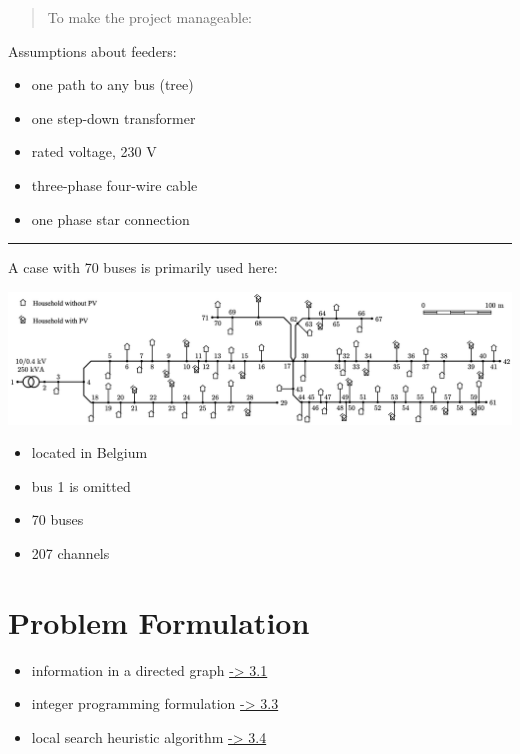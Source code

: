 \documentclass[
]{book}
\providecommand{\tightlist}{%
  \setlength{\itemsep}{0pt}\setlength{\parskip}{0pt}}
\begin{document}
\begin{quote}
To make the project manageable:
\end{quote}

Assumptions about feeders:

\begin{itemize}
\tightlist
\item
  one path to any bus (tree)
\item
  one step-down transformer
\item
  rated voltage, 230 V
\item
  three-phase four-wire cable
\item
  one phase star connection
\end{itemize}

\begin{center}\rule{0.5\linewidth}{0.5pt}\end{center}

A case with 70 buses is primarily used here:

\includegraphics{Pictures/case70true.png}

\begin{itemize}
\tightlist
\item
  located in Belgium
\item
  bus 1 is omitted
\item
  70 buses
\item
  207 channels
\end{itemize}

\hypertarget{problem-formulation}{%
\chapter{Problem Formulation}\label{problem-formulation}}

\begin{itemize}
\tightlist
\item
  information in a directed graph \href{directed}{-\textgreater{} 3.1}
\item
  integer programming formulation \protect\hyperlink{IP}{-\textgreater{} 3.3}
\item
  local search heuristic algorithm \protect\hyperlink{combinatorial}{-\textgreater{} 3.4}
\end{itemize}
\end{document}
